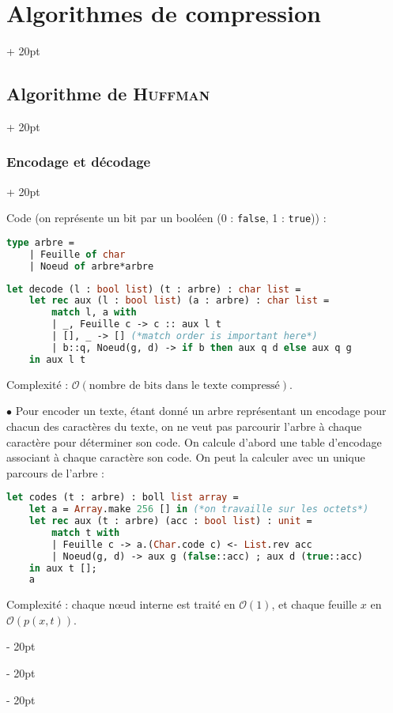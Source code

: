 \documentclass[a4paper, 12pt, twoside]{article}
\newcommand{\ind}[1][20pt]{\advance\leftskip + #1}
\newcommand{\deind}[1][20pt]{\advance\leftskip - #1}
\newenvironment{indt}[2][20pt]{#2 \par \ind[#1]}{\par \deind} %
\begin{document}
\begin{indt}{\section{Algorithmes de compression}}
\begin{indt}{\subsection{Algorithme de \textsc{Huffman}}}
\begin{indt}{\subsubsection{Encodage et décodage}}
                \vspace{6pt}
                
                Code (on représente un bit par un booléen (0 : \texttt{false}, 1 : \texttt{true})) :
                
                \vspace{12pt}

                \begin{lstlisting}[language=Caml, xleftmargin=80pt]
type arbre =
    | Feuille of char
    | Noeud of arbre*arbre\end{lstlisting}
                
                \newpage
                
                \begin{lstlisting}[language=Caml, xleftmargin=80pt]
let decode (l : bool list) (t : arbre) : char list =
    let rec aux (l : bool list) (a : arbre) : char list =
        match l, a with
        | _, Feuille c -> c :: aux l t
        | [], _ -> [] (*match order is important here*)
        | b::q, Noeud(g, d) -> if b then aux q d else aux q g
    in aux l t\end{lstlisting}

                Complexité : $\mathcal O(\text{nombre de bits dans le texte compressé})$.

                \vspace{12pt}
                
                $\bullet$ Pour encoder un texte, étant donné un arbre représentant un encodage pour chacun des caractères du texte, on ne veut pas parcourir l'arbre à chaque caractère pour déterminer son code. On calcule d'abord une table d'encodage associant à chaque caractère son code. On peut la calculer avec un unique parcours de l'arbre :

                \begin{lstlisting}[language=Caml, xleftmargin=80pt]
let codes (t : arbre) : boll list array =
    let a = Array.make 256 [] in (*on travaille sur les octets*)
    let rec aux (t : arbre) (acc : bool list) : unit =
        match t with
        | Feuille c -> a.(Char.code c) <- List.rev acc
        | Noeud(g, d) -> aux g (false::acc) ; aux d (true::acc)
    in aux t [];
    a\end{lstlisting}

                Complexité : chaque n\oe ud interne est traité en $\mathcal O(1)$, et chaque feuille $x$ en $\mathcal O(p(x ,t))$.


\end{indt}
\end{indt}
\end{indt}
\end{document}
